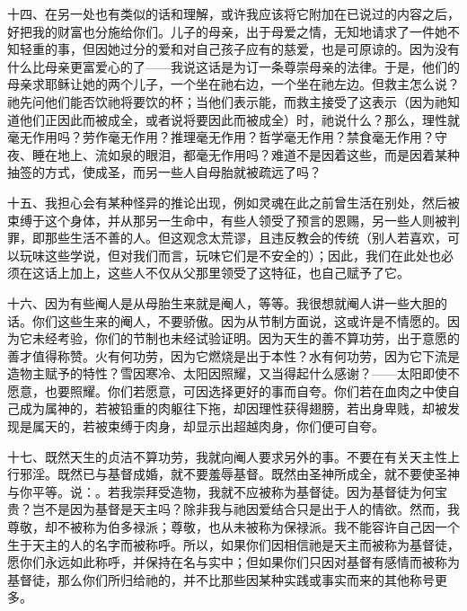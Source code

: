 十四、在另一处也有类似的话和理解，或许我应该将它附加在已说过的内容之后，好把我的财富也分施给你们。儿子的母亲，出于母爱之情，无知地请求了一件她不知轻重的事，但因她过分的爱和对自己孩子应有的慈爱，也是可原谅的。因为没有什么比母亲更富爱心的了——我说这话是为订一条尊崇母亲的法律。于是，他们的母亲求耶稣让她的两个儿子，一个坐在祂右边，一个坐在祂左边。但救主怎么说？祂先问他们能否饮祂将要饮的杯；当他们表示能，而救主接受了这表示（因为祂知道他们正因此而被成全，或者说将要因此而被成全）时，祂说什么？那么，理性就毫无作用吗？劳作毫无作用？推理毫无作用？哲学毫无作用？禁食毫无作用？守夜、睡在地上、流如泉的眼泪，都毫无作用吗？难道不是因着这些，而是因着某种抽签的方式，使成圣，而另一些人自母胎就被疏远了吗？\par

十五、我担心会有某种怪异的推论出现，例如灵魂在此之前曾生活在别处，然后被束缚于这个身体，并从那另一生命中，有些人领受了预言的恩赐，另一些人则被判罪，即那些生活不善的人。但这观念太荒谬，且违反教会的传统（别人若喜欢，可以玩味这些学说，但对我们而言，玩味它们是不安全的）；因此，我们在此处也必须在这话上加上，这些人不仅从父那里领受了这特征，也自己赋予了它。\par

十六、因为有些阉人是从母胎生来就是阉人，等等。我很想就阉人讲一些大胆的话。你们这些生来的阉人，不要骄傲。因为从节制方面说，这或许是不情愿的。因为它未经考验，你们的节制也未经试验证明。因为天生的善不算功劳，出于意愿的善才值得称赞。火有何功劳，因为它燃烧是出于本性？水有何功劳，因为它下流是造物主赋予的特性？雪因寒冷、太阳因照耀，又当得起什么感谢？——太阳即使不愿意，也要照耀。你们若愿意，可因选择更好的事而自夸。你们若在血肉之中使自己成为属神的，若被铅重的肉躯往下拖，却因理性获得翅膀，若出身卑贱，却被发现是属天的，若被束缚于肉身，却显示出超越肉身，你们便可自夸。\par

十七、既然天生的贞洁不算功劳，我就向阉人要求另外的事。不要在有关天主性上行邪淫。既然已与基督成婚，就不要羞辱基督。既然由圣神所成全，就不要使圣神与你平等。说：。若我崇拜受造物，我就不应被称为基督徒。因为基督徒为何宝贵？岂不是因为基督是天主吗？除非我与祂因爱结合只是出于人的情欲。然而，我尊敬，却不被称为伯多禄派；尊敬，也从未被称为保禄派。我不能容许自己因一个生于天主的人的名字而被称呼。所以，如果你们因相信祂是天主而被称为基督徒，愿你们永远如此称呼，并保持在名与实中；但如果你们只因对基督有感情而被称为基督徒，那么你们所归给祂的，并不比那些因某种实践或事实而来的其他称号更多。\par

